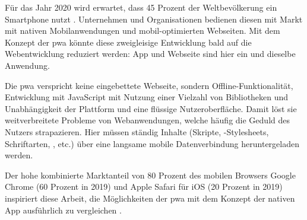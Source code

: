 Für das Jahr 2020 wird erwartet, dass 45 Prozent der Weltbevölkerung ein Smartphone nutzt
\cite{StatistaSmartphonesWorldwide}\cite{StatistaWorldPopulation}.
Unternehmen und Organisationen bedienen diesen mit Markt mit nativen Mobilanwendungen und mobil-optimierten Webseiten.
Mit dem Konzept der \ac{pwa} könnte diese zweigleisige Entwicklung bald auf die Webentwicklung reduziert werden: App und Webseite sind hier ein und dieselbe Anwendung. 


Die \ac{pwa} verspricht keine eingebettete Webseite, sondern Offline-Funktionalität, Entwicklung mit JavaScript mit Nutzung einer Vielzahl von Bibliotheken und Unabhängigkeit der Plattform und eine flüssige Nutzeroberfläche. Damit löst sie weitverbreitete Probleme von Webanwendungen, welche häufig die Geduld des Nutzers strapazieren. Hier müssen ständig Inhalte (Skripte, -Stylesheets, Schriftarten, , etc.) über eine langsame mobile Datenverbindung heruntergeladen werden.

Der hohe kombinierte Marktanteil von 80 Prozent des mobilen Browsers Google Chrome (60 Prozent in 2019) und Apple Safari für iOS (20 Prozent in 2019) inspiriert diese Arbeit, die Möglichkeiten der \ac{pwa} mit dem Konzept der nativen App ausführlich zu vergleichen \cite{StatistaMobileBrowserMarketShare}.

